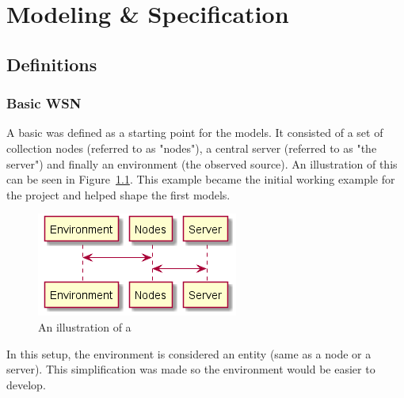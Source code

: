 \chapter{Modeling \& Specification}


\section{Definitions}

\subsection{Basic WSN}

A basic \wsn was defined as a starting point for the models. It consisted of a set of collection nodes (referred to as "nodes"), a central server (referred to as "the server") and finally an environment (the observed source). An illustration of this can be seen in Figure~\ref{fig:basic_wsn}. This example became the initial working example for the project and helped shape the first models.

\begin{figure}[ht]
    \includegraphics[scale=0.3]{include/figures/basic_wsn}
    \caption{An illustration of a \wsn}
    \label{fig:basic_wsn}
\end{figure}

In this setup, the environment is considered an entity (same as a node or a server). This simplification was made so the environment would be easier to develop. 




